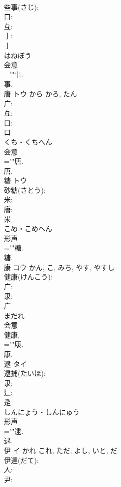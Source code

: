 \documentclass[8pt]{extreport}
\begin{document}
\begin{CJK}{UTF8}{min}
\\	些事(さじ): 
\\	口: 
\\	彑: 
\\	亅: 
\\	亅	
\\	はねぼう	
\\	会意 
\\	=""事.
\\	事.
\\	唐	トウ	から	かろ, たん	
\\	广: 
\\	彑: 
\\	口: 
\\	口	
\\	くち・くちへん	
\\	会意 
\\	=""唐.
\\	唐.
\\	糖	トウ			
\\	砂糖(さとう): 
\\	米: 
\\	唐: 
\\	米	
\\	こめ・こめへん	
\\	形声 
\\	=""糖.
\\	糖.
\\	康	コウ		かん, こ, みち, やす, やすし	
\\	健康(けんこう): 
\\	广: 
\\	隶: 
\\	广	
\\	まだれ	
\\	会意 
\\	健康, 
\\	=""康.
\\	康.
\\	逮	タイ			
\\	逮捕(たいほ): 
\\	隶: 
\\	辶: 
\\	辵	
\\	しんにょう・しんにゅう	
\\	形声 
\\	=""逮.
\\	逮.
\\	伊	イ	かれ	これ, ただ, よし, いと, だ	
\\	伊達(だて): 
\\	人: 
\\	尹: 

\end{CJK}
\end{document}
